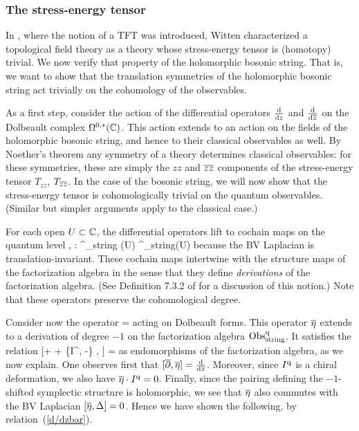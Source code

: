 \subsubsection{The stress-energy tensor}

In \cite{WittenTop}, where the notion of a TFT was introduced,
Witten characterized a topological field theory
as a theory whose stress-energy tensor is (homotopy) trivial. 
We now verify that property of the holomorphic bosonic string.
That is, we want to show that the translation symmetries of the holomorphic bosonic string act trivially on the cohomology of the observables.

As a first step, consider the action of the differential operators $\frac{\d}{\d z}$ and $\frac{\d}{\d \zbar}$ on the Dolbeault complex $\Omega^{0,*}(\CC)$. 
This action extends to an action on the fields of the holomorphic bosonic string, and hence to their classical observables as well. 
By Noether's theorem any symmetry of a theory determines classical observables: 
for these symmetries, these are simply the $zz$ and $\zbar \zbar$ components of the stress-energy tensor $T_{zz}$, $T_{\zbar \zbar}$. 
In the case of the bosonic string, we will now show that the stress-energy tensor is cohomologically trivial on the quantum observables.
(Similar but simpler arguments apply to the classical case.)

For each open $U \subset \CC$, the differential operators lift to cochain maps on the quantum level
\ben
{} , \frac{\d}{\d \zbar} : \Obs^\q_{\rm string} (U) \to \Obs^\q_{\rm string}(U) 
\een 
because the BV Laplacian is translation-invariant.
These cochain maps intertwine with the structure maps of the factorization algebra 
in the sense that they define {\em derivations} of the factorization algebra. 
(See Definition 7.3.2 of \cite{CG1} for a discussion of this notion.)
Note that these operators preserve the cohomological degree. 

Consider now the operator 
\ben
\Bar{\eta} = \frac{\partial}{\partial (\d \zbar)} 
\een 
acting on Dolbeault forms. 
This operator $\Bar{\eta}$ extends to a derivation of degree $-1$ on the factorization algebra $\Obs^\q_{\rm string}$. 
It satisfies the relation
\be\label{d/dzbar}
[\dbar + \hbar \Delta + \{I^\q, -\} , \Bar{\eta}] =  \frac{\d}{\d \zbar}
\ee
as endomorphisms of the factorization algebra, as we now explain.
One observes first that $[\dbar, \Bar{\eta}] =  \frac{\d}{\d \zbar}$. 
Moreover, since $I^\q$ is a chiral deformation, we also have $\Bar{\eta} \cdot I^\q = 0$. 
Finally, since the pairing defining the $-1$-shifted symplectic structure is holomorphic, 
we see that $\Bar{\eta}$ also commutes with the BV Laplacian $[\Bar{\eta}, \Delta] = 0$. 
Hence we have shown the following, by relation~(\ref{d/dzbar}).

